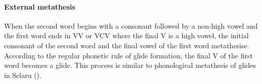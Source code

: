 \begin{exe}
	\label{ex:IntMetVVCV->VVC}
\end{exe}

\paragraph{External metathesis}\label{sec:LetExtMet}
When the second word begins with a consonant followed by a non-high vowel
and the first word ends in VV or VCV where the final V is a high vowel,
the initial consonant of the second word and the final vowel of the first word metathesise.
According to the regular phonetic rule of glide formation, the final V of the first word becomes a glide.
This process is similar to phonological metathesis of glides in Selaru ().

\begin{exe}
	\label{LetExtMet}
\end{exe}

